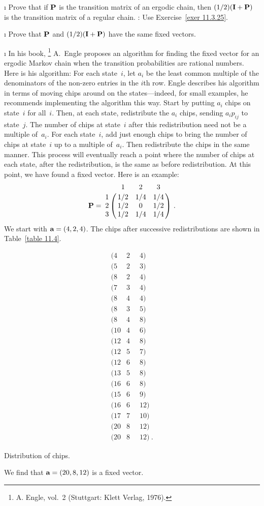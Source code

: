 \begin{LJSItem}
\i\label{exer 11.3.26} Prove that if ${\mbox{\bf P}\/}$ is the transition matrix of an 
ergodic chain, then $(1/2)({\mbox{\bf I}\/} + {\mbox{\bf P}\/})$ is the transition matrix of a 
regular chain.  : Use Exercise~\ref{exer 11.3.25}.

\i\label{exer 11.3.27} Prove that ${\mbox{\bf P}\/}$ and $(1/2)({\mbox{\bf I}\/} + {\mbox{\bf P}\/})$
have the
same fixed vectors.

\i\label{exer 11.3.28} In his book, \footnote{A. Engle,  vol.~2 
(Stuttgart: Klett Verlag, 1976).} A.~Engle proposes an
algorithm for finding the fixed
vector for an ergodic Markov chain when the transition probabilities are
rational numbers. 
Here is his algorithm: For each state~$i$, let $a_i$ be the  least common
multiple of the
denominators of the non-zero entries in the $i$th  row.  Engle describes his
algorithm in
terms of moving chips around on the states---indeed, for small examples, he
recommends
implementing the algorithm this way.  Start by putting $a_i$ chips on state~$i$
for
all~$i$.  Then, at each state, redistribute the $a_i$ chips, sending $a_i
p_{ij}$ to
state~$j$.  The number of chips at state~$i$ after this redistribution need not
be a
multiple of~$a_i$.  For each state~$i$, add just enough chips to bring the
number of chips at state~$i$ up to a multiple of~$a_i$.  Then redistribute the
chips in the same manner.  This process will eventually reach a point where the
number of chips at each state, after the redistribution, is the same as before
redistribution.  At this point, we have found a fixed vector.  Here is an
example:
$$
\mat {P} = \bordermatrix{
& 1 & 2 & 3 \cr
1 & 1/2 & 1/4 & 1/4 \cr
2 & 1/2 & 0 & 1/2 \cr
3 & 1/2 & 1/4 & 1/4}\ .
$$
We start with ${\mbox{\bf a}\/} = (4,2,4)$.  The chips after successive redistributions
are
shown in Table~\ref{table 11.4}.

\begin{table}
\centering
$$\begin{array}{lll}
(4 & 2\;\; & 4)\\
(5 & 2 & 3)\\
(8 & 2 & 4)\\
(7 & 3 & 4)\\
(8 & 4 & 4)\\
(8 & 3 & 5)\\
(8 & 4 & 8)\\
(10 & 4 & 6)\\
(12 & 4 & 8)\\
(12 & 5 & 7)\\
(12 & 6 & 8)\\
(13 & 5 & 8)\\
(16 & 6 & 8)\\
(15 & 6 & 9)\\
(16 & 6 & 12)\\
(17 & 7 & 10)\\
(20 & 8 & 12)\\
(20 & 8 & 12)\ .
\end{array}
$$
\caption{Distribution of  chips.}
\label{table 11.4}
\end{table}
We find that ${\mbox{\bf a}\/} = (20,8,12)$ is a fixed vector.


\end{LJSItem}
